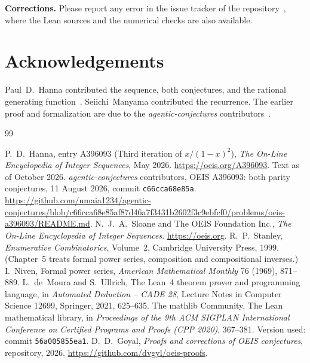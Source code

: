 \documentclass[11pt,a4paper]{article}
\theoremstyle{definition}
\theoremstyle{remark}
\newcommand{\para}[1]{\par\medskip\noindent\textbf{#1}\enspace}
\begin{document}
\para{Corrections.} Please report any error in the issue tracker of the repository~\cite{repo}, where the Lean sources and the numerical checks are also
available.

\section*{Acknowledgements}
Paul~D.~Hanna contributed the sequence, both conjectures, and the rational generating function~\cite{oeis}.
Seiichi~Manyama contributed the recurrence. The earlier proof and formalization are due to the
\emph{agentic-conjectures} contributors~\cite{prior}.

\begin{thebibliography}{99}\small
\raggedright
{} P.~D.~Hanna, entry A396093 (Third iteration of $x/(1-x)^2$), \emph{The On-Line Encyclopedia of Integer Sequences}, May 2026. \url{https://oeis.org/A396093}. Text as of October 2026.
 \emph{agentic-conjectures} contributors, OEIS A396093: both parity conjectures, 11 August 2026, commit \texttt{c66cca68e85a}. \url{https://github.com/umaia1234/agentic-conjectures/blob/c66cca68e85af87d46a7f3431b2602f3c9ebfcf0/problems/oeis-a396093/README.md}.
 N.~J.~A.~Sloane and The OEIS Foundation Inc., \emph{The On-Line Encyclopedia of Integer Sequences}. \url{https://oeis.org}.
 R.~P.~Stanley, \emph{Enumerative Combinatorics}, Volume~2, Cambridge University Press, 1999. (Chapter~5 treats formal power series, composition and compositional inverses.)
 I.~Niven, Formal power series, \emph{American Mathematical Monthly} 76 (1969), 871--889.
 L.~de~Moura and S.~Ullrich, The Lean~4 theorem prover and programming language, in \emph{Automated Deduction -- CADE 28}, Lecture Notes in Computer Science 12699, Springer, 2021, 625--635.
 The mathlib Community, The Lean mathematical library, in \emph{Proceedings of the 9th ACM SIGPLAN International Conference on Certified Programs and Proofs (CPP 2020)}, 367--381. Version used: commit \texttt{56a005855ea1}.
 D.~D.~Goyal, \emph{Proofs and corrections of OEIS conjectures}, repository, 2026. \url{https://github.com/dvgyl/oeis-proofs}.
\end{thebibliography}
\end{document}
